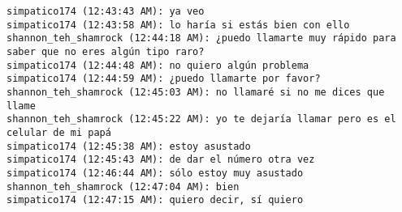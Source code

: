 \begin{verbatim}
simpatico174 (12:43:43 AM): ya veo
simpatico174 (12:43:58 AM): lo haría si estás bien con ello
shannon_teh_shamrock (12:44:18 AM): ¿puedo llamarte muy rápido para saber que no eres algún tipo raro?
simpatico174 (12:44:48 AM): no quiero algún problema
simpatico174 (12:44:59 AM): ¿puedo llamarte por favor?
shannon_teh_shamrock (12:45:03 AM): no llamaré si no me dices que llame
shannon_teh_shamrock (12:45:22 AM): yo te dejaría llamar pero es el celular de mi papá
simpatico174 (12:45:38 AM): estoy asustado
simpatico174 (12:45:43 AM): de dar el número otra vez 
simpatico174 (12:46:44 AM): sólo estoy muy asustado
shannon_teh_shamrock (12:47:04 AM): bien
simpatico174 (12:47:15 AM): quiero decir, sí quiero 
\end{verbatim}
